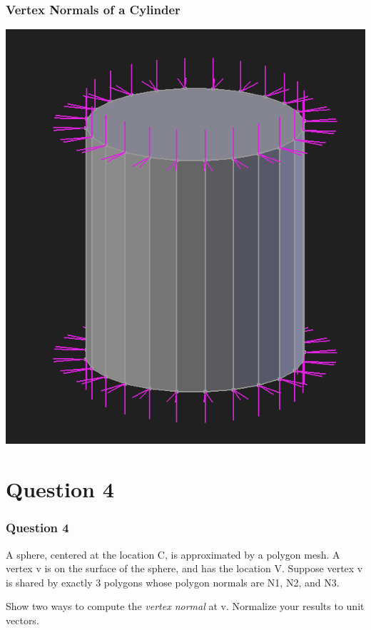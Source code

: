 \documentclass{beamer}
\begin{document}
\begin{frame}
    \frametitle{Vertex Normals of a Cylinder}

    \begin{center}
        \includegraphics[scale=0.4]{images/solid_cylinder_normals.png}
    \end{center}

\end{frame}

\section{Question 4}

\begin{frame}
    \frametitle{Question 4}

    A sphere, centered at the location C, is approximated by a polygon mesh.  
    A vertex v is on the surface of the sphere, and has the location V.  
    Suppose vertex v is shared by exactly 3 polygons whose polygon normals are N1, N2, and N3.
    
    \vspace*{1em}

    Show two ways to compute the \textit{vertex normal} at v. Normalize your results to unit vectors.

\end{frame}
\end{document}
